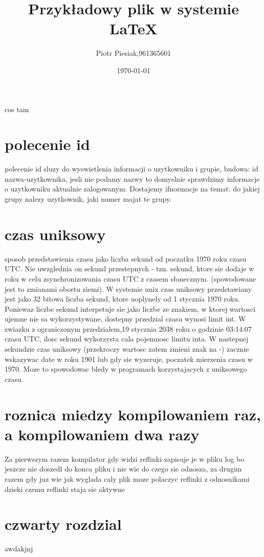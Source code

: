 \documentclass[a4paper]{article}
\author{Piotr Piesiak,961365601}
\title{Przykładowy plik w systemie \LaTeX}
\date{\today}
\begin{document}
\maketitle cos tam
\section{polecenie id}
polecenie id sluzy do wyswietlenia informacji o uzytkowniku i grupie, budowa:
id nazwa-uzytkownika, jesli nie podamy nazwy to domyslnie sprawdzimy informacje o uzytkowniku aktualnie zalogowanym. Dostajemy ifnormacje na temat: do jakiej grupy nalezy uzytkownik, jaki numer majat te grupy.


\section{czas uniksowy}
sposob przedstawienia czasu jako liczba sekund od poczatku 1970 roku czasu UTC.
Nie uwzglednia on sekund przestepnych - tzn. sekund, ktore sie dodaje w roku w celu zsynchronizowania
czasu UTC z czasem słonecznym. (spowodowane jest to zmianami obortu ziemi). W systemie unix czas uniksowy przedstawiany jest jako 32 bitowa liczba sekund, ktore uoplynely od 1 stycznia 1970 roku.
Poniewaz liczbe sekund interpetuje sie jako liczbe ze znakiem, w ktorej wartosci ujemne nie sa wykorzystywane, dostepny przedzial czasu wynosi limit int. W zwiazku z ograniczonym przedzialem,19 stycznia 2038 roku o godzinie 03:14:07 czasu UTC, ilosc sekund wykorzysta cala pojemnosc limitu inta. W nastepnej sekundzie czas uniksowy (przekroczy wartosc zatem zmieni znak na -) zacznie wskazywac date w roku 1901 lub gdy sie wyzeruje, poczatek mierzenia czasu w 1970. Moze to spowodowac bledy w programach korzystajacych z uniksowego czasu.






\section{roznica miedzy kompilowaniem raz, a kompilowaniem dwa razy}
Za pierwszym razem kompilator gdy widzi reflinki zapisuje je w pliku log bo jeszcze nie doszedl do konca pliku i nie wie do czego sie odnosza, za drugim razem gdy juz wie jak wyglada caly plik moze polaczyc reflinki z odnosnikami dzieki czemu reflinki staja sie aktywne



\section{czwarty rozdzial}
awdakjnj
\end{document}
